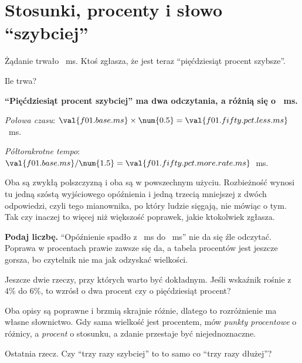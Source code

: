 \section{Stosunki, procenty i słowo \enquote{szybciej}}
\label{sec:F01-ratios}

\begin{fr}
Żądanie trwało ~ms. Ktoś zgłasza, że jest teraz
\enquote{pięćdziesiąt procent szybsze}.

Ile trwa?
\nextframe
\end{fr}

\begin{fr}
\begin{trapbox}
\textbf{\enquote{Pięćdziesiąt procent szybciej} ma dwa odczytania, a różnią się
o ~ms.}

\emph{Połowa czasu}: $\val{f01.base.ms} \times \num{0.5} =
\val{f01.fifty.pct.less.ms}$~ms.

\emph{Półtorakrotne tempo}: $\val{f01.base.ms} / \num{1.5} =
\val{f01.fifty.pct.more.rate.ms}$~ms.

Oba są zwykłą polszczyzną i oba są w powszechnym użyciu. Rozbieżność wynosi tu
jedną szóstą wyjściowego opóźnienia \dash{} i jedną trzecią mniejszej z dwóch
odpowiedzi, czyli tego mianownika, po który ludzie sięgają, nie mówiąc o tym.
Tak czy inaczej to więcej niż większość poprawek, jakie ktokolwiek zgłasza.

\textbf{Podaj liczbę.} \enquote{Opóźnienie spadło z ~ms do
~ms} nie da się źle odczytać. Poprawa w procentach
prawie zawsze się da, a tabela procentów jest jeszcze gorsza, bo czytelnik nie
ma jak odzyskać wielkości.
\end{trapbox}
Jeszcze dwie rzeczy, przy których warto być dokładnym. Jeśli wskaźnik rośnie z
4\% do 6\%, to wzrósł o dwa procent czy o pięćdziesiąt procent?
\nextframe
\end{fr}

\begin{fr}
Oba opisy są poprawne i brzmią skrajnie różnie, dlatego to rozróżnienie ma
własne słownictwo. Gdy sama wielkość jest procentem, mów \emph{punkty
procentowe} o różnicy, a \emph{procent} o stosunku, a zdanie przestaje być
niejednoznaczne.

Ostatnia rzecz. Czy \enquote{trzy razy szybciej} to to samo co \enquote{trzy
razy dłużej}?
\nextframe
\end{fr}

